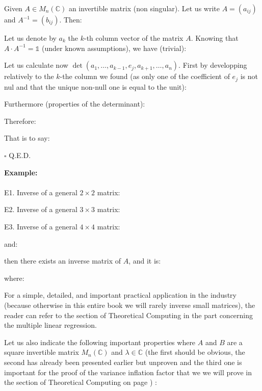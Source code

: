 	Given $A\in M_n(\mathbb{C})$ an invertible matrix (non singular). Let us write $A=(a_{ij})$ and $A^{-1}=(b_{ij})$. Then:
	
	\begin{dem}
	Let us denote by $a_k$ the $k$-th column vector of the matrix $A$. Knowing that $A\cdot A^{-1}=\mathds{1}$ (under known assumptions), we have (trivial):
	
	Let us calculate now $\det(a_1,\ldots,a_{k-1},e_j,a_{k+1},\ldots,a_n)$. First by developping relatively to the $k$-the column we found (as only one of the coefficient of $e_j$ is not nul and that the unique non-null one is equal to the unit):
	
	Furthermore (properties of the determinant):
	
	Therefore:
	
	That is to say:
	
	\begin{flushright}
		$\square$  Q.E.D.
	\end{flushright}
	\end{dem}
	\label{some matrix inverse}
	\begin{tcolorbox}[colframe=black,colback=white,sharp corners]
	\textbf{{\Large {}}Example:}\\\\
	E1. Inverse of a general $2\times 2$ matrix:
	
	
	E2. Inverse of a general $3\times 3$ matrix:
		
	
	E3. Inverse of a general $4\times 4$ matrix:
	
	and:
	\end{tcolorbox}
	
	\begin{tcolorbox}[colframe=black,colback=white,sharp corners]
	
	then there exists an inverse matrix of $A$, and it is:
	
	where:
	
	\end{tcolorbox}
	
	For a simple, detailed, and important practical application in the industry (because otherwise in this entire book we will rarely inverse small matrices), the reader can refer to the section of Theoretical Computing in the part concerning the multiple linear regression.
	
	Let us also indicate the following important properties where $A$ and $B$ are a square invertible matrix $M_{n}(\mathbb{C})$ and $\lambda\in\mathbb{C}$ (the first should be obvious, the second has already been presented earlier but unproven and the third one is important for the proof of the variance inflation factor that we we will prove in the section of Theoretical Computing on page \pageref{variance inflation factor}) :
	
